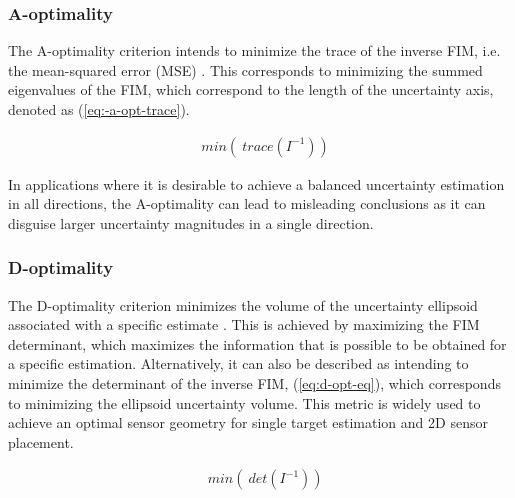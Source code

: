 \subsubsection{A-optimality}

The A-optimality criterion intends to minimize the trace of the inverse FIM, i.e. the mean-squared error (MSE) \cite{d-opt-mislead}. This corresponds to minimizing the summed eigenvalues of the FIM, which correspond to the length of the uncertainty axis, denoted as (\ref{eq:-a-opt-trace}).

\begin{eqnarray}
	& min( \ trace(I^{-1}))
	\label{eq:-a-opt-trace}
\end{eqnarray}


In applications where it is desirable to achieve a balanced uncertainty estimation in all directions, the A-optimality can lead to misleading conclusions as it can disguise larger uncertainty magnitudes in a single direction.

\subsubsection{D-optimality}

The D-optimality criterion minimizes the volume of the uncertainty ellipsoid associated with a specific estimate \cite{d-opt}. This is achieved by maximizing the FIM determinant, which maximizes the information that is possible to be obtained for a specific estimation. Alternatively, it can also be described as intending to minimize the determinant of the inverse FIM, (\ref{eq:d-opt-eq}), which corresponds to minimizing the ellipsoid uncertainty volume. This metric is widely used to achieve an optimal sensor geometry for single target estimation and 2D sensor placement. 

\begin{eqnarray}
	& min( \ det(I^{-1}))
	\label{eq:d-opt-eq}
\end{eqnarray}

